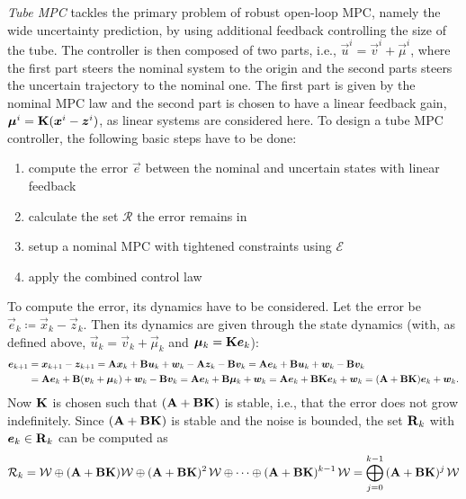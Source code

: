 		\emph{Tube MPC} tackles the primary problem of robust open-loop MPC, namely the wide uncertainty prediction, by using additional feedback controlling the size of the tube. The controller is then composed of two parts, i.e., \( \vec{u}^i = \vec{v}^i + \vec{\mu}^i \), where the first part steers the nominal system to the origin and the second parts steers the uncertain trajectory to the nominal one. The first part is given by the nominal MPC law and the second part is chosen to have a linear feedback gain, \( \bm{\mu}^i = \bm{\mathrm{K}} (\bm{x}^i - \bm{z}^i) \), as linear systems are considered here. To design a tube MPC controller, the following basic steps have to be done:
		\begin{enumerate}
			\item compute the error \( \vec{e} \) between the nominal and uncertain states with linear feedback
			\item calculate the set \(\mathcal{R}\) the error remains in
			\item setup a nominal MPC with tightened constraints using \(\mathcal{E}\)
			\item apply the combined control law
		\end{enumerate}
		To compute the error, its dynamics have to be considered. Let the error be \( \vec{e}_k \coloneqq \vec{x}_k - \vec{z}_k \). Then its dynamics are given through the state dynamics (with, as defined above, \( \vec{u}_k = \vec{v}_k + \vec{\mu}_k \) and \( \bm{\mu}_k = \bm{\mathrm{K}} \bm{e}_k \)):
		\begin{align}
			\bm{e}_{k + 1}
				&= \bm{x}_{k + 1} - \bm{z}_{k + 1}
				 = \bm{\mathrm{A}} \bm{x}_k + \bm{\mathrm{B}} \bm{u}_k + \bm{w}_k - \bm{\mathrm{A}} \bm{z}_k - \bm{\mathrm{B}} \bm{v}_k
				 = \bm{\mathrm{A}} \bm{e}_k + \bm{\mathrm{B}} \bm{u}_k + \bm{w}_k - \bm{\mathrm{B}} \bm{v}_k \\
				&= \bm{\mathrm{A}} \bm{e}_k + \bm{\mathrm{B}} (\bm{v}_k + \bm{\mu}_k) + \bm{w}_k - \bm{\mathrm{B}} \bm{v}_k
				 = \bm{\mathrm{A}} \bm{e}_k + \bm{\mathrm{B}} \bm{\mu}_k + \bm{w}_k
				 = \bm{\mathrm{A}} \bm{e}_k + \bm{\mathrm{B}} \bm{\mathrm{K}} \bm{e}_k + \bm{w}_k
				 = (\bm{\mathrm{A}} + \bm{\mathrm{B}} \bm{\mathrm{K}}) \bm{e}_k + \bm{w}_k.
		\end{align}
		Now \(\bm{\mathrm{K}}\) is chosen such that \( (\bm{\mathrm{A}} + \bm{\mathrm{B}} \bm{\mathrm{K}}) \) is stable, i.e., that the error does not grow indefinitely. Since \( (\bm{\mathrm{A}} + \bm{\mathrm{B}} \bm{\mathrm{K}}) \) is stable and the noise is bounded, the set \( \bm{\mathrm{R}}_k \) with \( \bm{e}_k \in \bm{\mathrm{R}}_k \) can be computed as
		\begin{equation}
			\mathcal{R}_k
				= \mathcal{W} \oplus (\bm{\mathrm{A}} + \bm{\mathrm{B}} \bm{\mathrm{K}}) \mathcal{W} \oplus (\bm{\mathrm{A}} + \bm{\mathrm{B}} \bm{\mathrm{K}})^{2\,} \mathcal{W} \oplus \cdots \oplus (\bm{\mathrm{A}} + \bm{\mathrm{B}} \bm{\mathrm{K}})^{k - 1\,} \mathcal{W}
				= \bigoplus_{j = 0}^{k - 1}\, (\bm{\mathrm{A}} + \bm{\mathrm{B}} \bm{\mathrm{K}})^{j\,} \mathcal{W}
		\end{equation}
